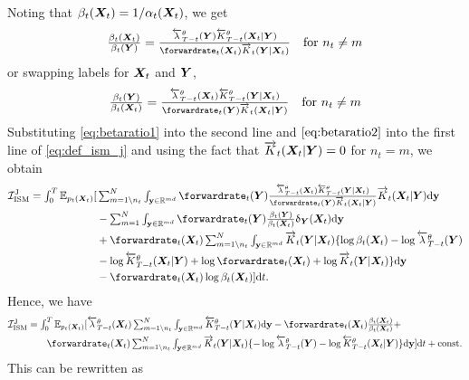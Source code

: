 Noting that $\beta_t({\bm{X}}_t) = 1 / \alpha_t({\bm{X}}_t)$, we get 
\begin{equation}
    \textstyle \frac{\beta_t ( \mX_t)}{\beta_t(\mY)} = \frac{\backwardrate_{T-t}^\theta (\mY) \btk_{T-t}^\theta(\mX_t | \mY)}{\forwardrate_t(\mX_t) \ftk_t(\mY | \mX_t)} \quad \text{for } n_t \neq m
    \label{eq:betaratio1}
\end{equation}
or swapping labels for ${\bm{X}}_t$ and ${\bm{Y}}$,
\begin{equation}
    \textstyle \frac{\beta_t ( \mY)}{\beta_t(\mX_t)} = \frac{\backwardrate_{T-t}^\theta (\mX_t) \btk_{T-t}^\theta(\mY | \mX_t)}{\forwardrate_t(\mY) \ftk_t(\mX_t | \mY)} \quad \text{for } n_t \neq m
    \label{eq:betaratio2}
\end{equation}
Substituting \eqref{eq:betaratio1} into the second line and
$\eqref{eq:betaratio2}$ into the first line of \eqref{eq:def_ism_j} and using
the fact that $\overrightarrow{K}_t({\bm{X}}_t | {\bm{Y}}) = 0$ for $n_t = m$, we obtain
\begin{align}
    \mathcal{I}_{\text{ISM}}^{\text{J}} = \textstyle \int_0^T \mathbb{E}_{p_t(\mX_t)} [&\textstyle  \intyNont \forwardrate_t(\mY)  \frac{\backwardrate_{T-t}^\theta (\mX_t) \btk_{T-t}^\theta(\mY | \mX_t)}{\forwardrate_t(\mY) \ftk_t(\mX_t | \mY)} \ftk_t(\mX_t | \mY) \rmd \y \\
    &\textstyle - \inty \forwardrate_t(\mY) \frac{\beta_t(\mY)}{\beta_t(\mX_t)} \updelta_{\mY} (\mX_t)  \rmd\y \\
    &\textstyle +\forwardrate_t(\mX_t) \intyNont \ftk_t(\mY | \mX_t) \{ \log \beta_t(\mX_t) - \log \backwardrate_{T-t}^\theta(\mY) \\ & \textstyle - \log \btk_{T-t}^\theta(\mX_t | \mY) 
    \textstyle   + \log \forwardrate_t(\mX_t) + \log \ftk_t(\mY | \mX_t)  \} \rmd \y \\
    &\textstyle - \forwardrate_t(\mX_t) \log \beta_t(\mX_t)] \rmd t . 
\end{align}
Hence, we have 
\begin{align}
  \textstyle 
    \mathcal{I}_{\text{ISM}}^{\text{J}} &\textstyle = \int_{0}^T \mathbb{E}_{p_t(\mX_t)} [\textstyle  \backwardrate_{T-t}^\theta(\mX_t) \intyNont \btk_{T-t}^\theta(\mY | \mX_t) \rmd\y - \forwardrate_t(\mX_t) \frac{\beta_t(\mX_t)}{\beta_t(\mX_t)}  + \\
    & \qquad\textstyle \forwardrate_t(\mX_t) \intyNont \ftk_t(\mY | \mX_t) \{ -\log \backwardrate_{T-t}^\theta(\mY) - \log \btk_{T-t}^\theta(\mX_t | \mY) \} \rmd \y ] \rmd t + \text{const} .
\end{align}
This can be rewritten as 
